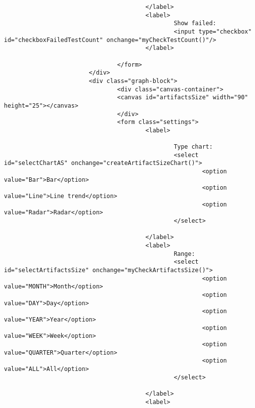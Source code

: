 \begin{lstlisting}
                                        </label>
                                        <label>
                                                Show failed:
                                                <input type="checkbox" id="checkboxFailedTestCount" onchange="myCheckTestCount()"/>
                                        </label>

                                </form>
                        </div>
                        <div class="graph-block">
                                <div class="canvas-container">
                                <canvas id="artifactsSize" width="90" height="25"></canvas>
                                </div>
                                <form class="settings">
                                        <label>

                                                Type chart:
                                                <select id="selectChartAS" onchange="createArtifactSizeChart()">
                                                        <option value="Bar">Bar</option>
                                                        <option value="Line">Line trend</option>
                                                        <option value="Radar">Radar</option>
                                                </select>

                                        </label>
                                        <label>
                                                Range:
                                                <select id="selectArtifactsSize" onchange="myCheckArtifactsSize()">
                                                        <option value="MONTH">Month</option>
                                                        <option value="DAY">Day</option>
                                                        <option value="YEAR">Year</option>
                                                        <option value="WEEK">Week</option>
                                                        <option value="QUARTER">Quarter</option>
                                                        <option value="ALL">All</option>
                                                </select>

                                        </label>
                                        <label>


\end{lstlisting}
